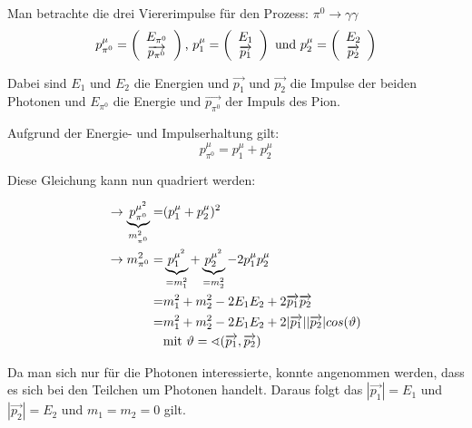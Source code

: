 \documentclass[a4paper,11pt,oneside,final,german,openbib,pdftex]{scrbook}
\begin{document}
{\begin{appendix}
Man betrachte die drei Viererimpulse f\"ur den Prozess: $\pi^0\rightarrow \gamma\gamma $
\begin{equation}
p_{\pi^0}^{\mu}=\left(\begin{array}{c}E_{\pi^0}\\\overrightarrow{p_{\pi^0}}\end{array}\right) \textnormal{,  }
p_{1}^{\mu}=\left(\begin{array}{c}E_{1}\\\overrightarrow{p_{1}}\end{array}\right) \textnormal{ und  } p_{2}^{\mu}=\left(\begin{array}{c}E_{2}\\\overrightarrow{p_{2}}\end{array}\right)
\end{equation}

Dabei sind $E_{1}$ und $E_{2}$ die Energien und $\overrightarrow{p_{1}}$ und $\overrightarrow{p_{2}}$ die Impulse der beiden Photonen und $E_{\pi^0}$ die Energie und $\overrightarrow{p_{\pi^0}}$ der Impuls des Pion.

Aufgrund der Energie- und Impulserhaltung gilt:
\begin{equation}
p^{\mu}_{\pi^0} = p^{\mu}_1 + p^{\mu}_2
\end{equation}

Diese Gleichung kann nun quadriert werden:

\begin{equation}
\begin{split}
\rightarrow \underbrace{p^{\mu^2}_{\pi^0}}_{m_{\pi^0}^2}=& (p_{1}^{\mu}+p_{2}^{\mu})^2 \\ 
\rightarrow m_{\pi^0}^2=& \underbrace{p_{1}^{\mu^2}}_{=m_1^2}+\underbrace{p_{2}^{\mu^2}}_{=m_2^2}-2p_{1}^{\mu}p_{2}^{\mu} \\ 
=& m_1^2+m_2^2-2E_1E_2+2\overrightarrow{p_1}\overrightarrow{p_2} \\ 
=& m_1^2+m_2^2-2E_1E_2+2|\overrightarrow{p_1}| |\overrightarrow{p_2}| cos(\vartheta) \\
&\textnormal{mit } \vartheta=\sphericalangle(\overrightarrow{p_1},\overrightarrow{p_2})
\end{split}
\end{equation}

Da man sich nur f\"ur die Photonen interessierte, konnte angenommen werden, dass es sich bei den Teilchen um Photonen handelt. Daraus folgt das $|\overrightarrow{p_1}|=E_1$ und $|\overrightarrow{p_2}|=E_2$ und $m_1=m_2=0$ gilt.


\end{appendix}}
\end{document}
